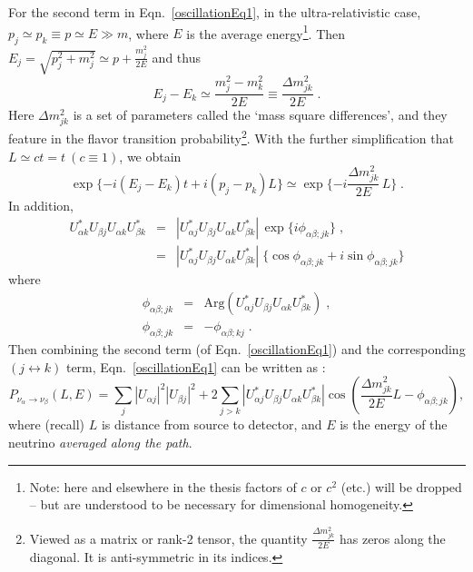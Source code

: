 For the second term in Eqn.~\ref{oscillationEq1}, in the ultra-relativistic case, $p_j\simeq p_k\equiv p\simeq E\gg m$, where $E$ is the average energy\footnote{Note: here and elsewhere in the thesis factors of $c$ or $c^2$ (etc.) will be dropped -- but are understood to be necessary for dimensional homogeneity.}. Then $E_j=\sqrt{p^2_j+m^2_j}\simeq p+\frac{m_j^2}{2E}$ and thus \cite{pdg2020,aitchison2012gauge}
\begin{equation}
E_j-E_k\simeq \frac{m^2_j-m^2_k}{2E}\equiv \frac{\Delta m^2_{jk}}{2E} \; .   
\end{equation}
Here $\Delta m^2_{jk}$ is a set of parameters called the `mass square differences', and they feature in the flavor transition probability\footnote{Viewed as a matrix or rank-2 tensor, the quantity $\frac{\Delta m^2_{jk}}{2E}$ has zeros along the diagonal. It is anti-symmetric in its indices.}. With the further simplification that $L\simeq ct=t~(c\equiv 1)$, we obtain
\begin{equation*}
\exp\{-i(E_j-E_k)t+i(p_j-p_k)L\}\simeq \exp\{-i\frac{\Delta m^2_{jk}}{2E} \, L\} \; .     
\end{equation*}
In addition,
\begin{eqnarray*}
U^*_{\alpha k}U_{\beta j}U_{\alpha k}U^*_{\beta k} &=& |U^*_{\alpha j}U_{\beta j}U_{\alpha k}U^*_{\beta k}| \, \exp\{i\phi_{\alpha\beta;jk}\} \; ,  \\
&=& |U^*_{\alpha j}U_{\beta j}U_{\alpha k}U^*_{\beta k}| \; \{ \cos \phi_{\alpha\beta;jk} + i \sin \phi_{\alpha\beta;jk}\}
\end{eqnarray*}
where 
\begin{eqnarray*}
\phi_{\alpha\beta;jk} &=& \mathrm{Arg}(U^*_{\alpha j}U_{\beta j}U_{\alpha k}U^*_{\beta k}) \; , \\
\phi_{\alpha\beta;jk} &=& -\phi_{\alpha\beta;kj} \; .     
\end{eqnarray*}
Then combining the second term (of Eqn.~\ref{oscillationEq1}) and the corresponding $(j\leftrightarrow k)$ term, Eqn.~\ref{oscillationEq1} can be written as \cite{aitchison2012gauge}:
\begin{equation}\label{oscillationEq2}
P_{\nu_\alpha\to\nu_\beta}(L,E)=
\sum_j |U_{\alpha j}|^2|U_{\beta j}|^2 + 2\sum_{j>k}|U^*_{\alpha j}U_{\beta j}U_{\alpha k}U^*_{\beta k}|\cos(\frac{\Delta m^2_{jk}}{2E}L-\phi_{\alpha\beta;jk}),
\end{equation}
where (recall) $L$ is distance from source to detector, and $E$ is the energy of the neutrino {\em averaged along the path}.

